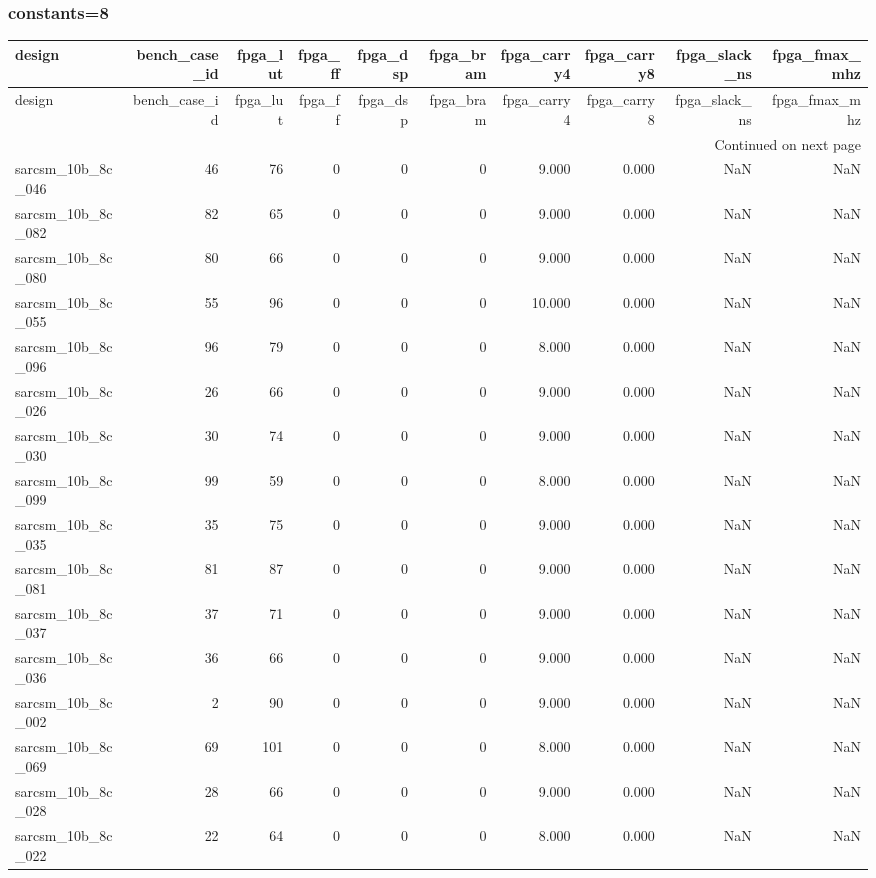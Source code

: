 \documentclass{article}
\begin{document}
\subsubsection*{constants=8}
\begin{longtable}{lrrrrrrrrr}
\toprule
design & bench\_case\_id & fpga\_lut & fpga\_ff & fpga\_dsp & fpga\_bram & fpga\_carry4 & fpga\_carry8 & fpga\_slack\_ns & fpga\_fmax\_mhz \\
\midrule
\endfirsthead
\toprule
design & bench\_case\_id & fpga\_lut & fpga\_ff & fpga\_dsp & fpga\_bram & fpga\_carry4 & fpga\_carry8 & fpga\_slack\_ns & fpga\_fmax\_mhz \\
\midrule
\endhead
\midrule
\multicolumn{10}{r}{Continued on next page} \\
\midrule
\endfoot
\bottomrule
\endlastfoot
sarcsm\_10b\_8c\_046 & 46 & 76 & 0 & 0 & 0 & 9.000 & 0.000 & NaN & NaN \\
sarcsm\_10b\_8c\_082 & 82 & 65 & 0 & 0 & 0 & 9.000 & 0.000 & NaN & NaN \\
sarcsm\_10b\_8c\_080 & 80 & 66 & 0 & 0 & 0 & 9.000 & 0.000 & NaN & NaN \\
sarcsm\_10b\_8c\_055 & 55 & 96 & 0 & 0 & 0 & 10.000 & 0.000 & NaN & NaN \\
sarcsm\_10b\_8c\_096 & 96 & 79 & 0 & 0 & 0 & 8.000 & 0.000 & NaN & NaN \\
sarcsm\_10b\_8c\_026 & 26 & 66 & 0 & 0 & 0 & 9.000 & 0.000 & NaN & NaN \\
sarcsm\_10b\_8c\_030 & 30 & 74 & 0 & 0 & 0 & 9.000 & 0.000 & NaN & NaN \\
sarcsm\_10b\_8c\_099 & 99 & 59 & 0 & 0 & 0 & 8.000 & 0.000 & NaN & NaN \\
sarcsm\_10b\_8c\_035 & 35 & 75 & 0 & 0 & 0 & 9.000 & 0.000 & NaN & NaN \\
sarcsm\_10b\_8c\_081 & 81 & 87 & 0 & 0 & 0 & 9.000 & 0.000 & NaN & NaN \\
sarcsm\_10b\_8c\_037 & 37 & 71 & 0 & 0 & 0 & 9.000 & 0.000 & NaN & NaN \\
sarcsm\_10b\_8c\_036 & 36 & 66 & 0 & 0 & 0 & 9.000 & 0.000 & NaN & NaN \\
sarcsm\_10b\_8c\_002 & 2 & 90 & 0 & 0 & 0 & 9.000 & 0.000 & NaN & NaN \\
sarcsm\_10b\_8c\_069 & 69 & 101 & 0 & 0 & 0 & 8.000 & 0.000 & NaN & NaN \\
sarcsm\_10b\_8c\_028 & 28 & 66 & 0 & 0 & 0 & 9.000 & 0.000 & NaN & NaN \\
sarcsm\_10b\_8c\_022 & 22 & 64 & 0 & 0 & 0 & 8.000 & 0.000 & NaN & NaN \\

\end{longtable}
\end{document}
